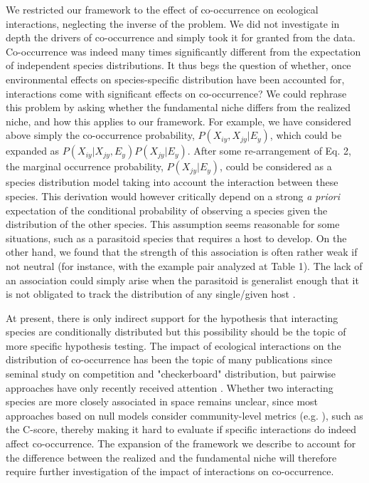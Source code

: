 \documentclass[12pt]{article}
\begin{document}
We restricted our framework to the effect of co-occurrence on ecological
interactions, neglecting the inverse of the problem. We did not investigate in
depth the drivers of co-occurrence and simply took it for granted from the
data. Co-occurrence was indeed many times significantly different from the
expectation of independent species distributions. It thus begs the question of
whether, once environmental effects on species-specific distribution have been
accounted for, interactions come with significant effects on co-occurrence? We
could rephrase this problem by asking whether the fundamental niche differs
from the realized niche, and how this applies to our framework. For example,
we have considered above simply the co-occurrence probability,
$P(X_{iy},X_{jy}|E_y)$, which could be expanded as $P(X_{iy}|X_{jy},E_y)
P(X_{jy}| E_y )$. After some re-arrangement of Eq. 2, the marginal occurrence
probability, $P(X_{jy}|E_y )$, could be considered as a species distribution
model taking into account the interaction between these species. This
derivation would however critically depend on a strong \emph{a priori} expectation of
the conditional probability of observing a species given the distribution of
the other species. This assumption seems reasonable for some situations, such
as a parasitoid species that requires a host to develop. On the other hand, we
found that the strength of this association is often rather weak if not
neutral (for instance, with the example pair analyzed at Table 1). The lack of
an association could simply arise when the parasitoid is generalist enough 
that it is not obligated to track the distribution of any single/given host
\citep{Cazelles2015}. 

At present, there is only indirect support for the hypothesis that interacting
species are conditionally distributed but this possibility should be the
topic of more specific hypothesis testing. The impact of ecological
interactions on the distribution of co-occurrence has been the topic of many
publications since \citealt{Diamond1975} seminal study on competition and
"checkerboard" distribution, but pairwise approaches have only recently
received attention \citep{Veech2013}. Whether two interacting species are more
closely associated in space remains unclear, since most approaches based on
null models consider community-level metrics (e.g. \citealt{Gotelli2000}),
such as the C-score, thereby making it hard to evaluate if specific
interactions do indeed affect co-occurrence. The expansion of the framework we
describe to account for the difference between the realized and the
fundamental niche will therefore require further investigation of the impact
of interactions on co-occurrence.
\end{document}
